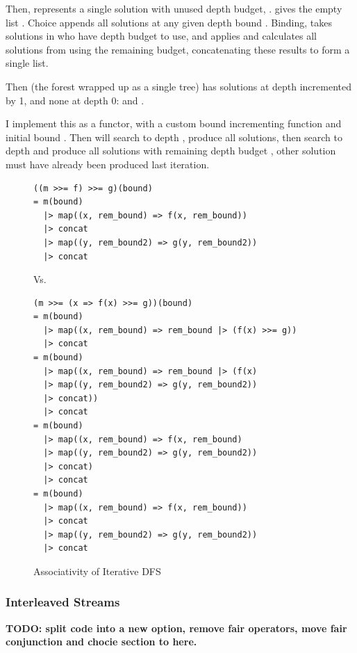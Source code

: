 Then,  represents a single solution with unused depth budget, .  gives the empty list . Choice appends all solutions at any given depth bound . Binding,  takes solutions in  who have depth budget to use, and applies  and calculates all solutions from  using the remaining budget, concatenating these results to form a single list.

Then  (the forest  wrapped up as a single tree) has solutions at depth incremented by 1, and none at depth 0:  and .

I implement this as a functor, with a custom bound incrementing function  and initial bound . Then  will   search to depth , produce all solutions, then search to depth  and produce all solutions with remaining depth budget , other solution must have already been produced last iteration.

\begin{figure}
\begin{verbatim}
((m >>= f) >>= g)(bound)
= m(bound) 
  |> map((x, rem_bound) => f(x, rem_bound))
  |> concat
  |> map((y, rem_bound2) => g(y, rem_bound2))
  |> concat
\end{verbatim}
Vs.
\begin{verbatim}
(m >>= (x => f(x) >>= g))(bound)
= m(bound)
  |> map((x, rem_bound) => rem_bound |> (f(x) >>= g))
  |> concat
= m(bound)
  |> map((x, rem_bound) => rem_bound |> (f(x) 
  |> map((y, rem_bound2) => g(y, rem_bound2)) 
  |> concat))
  |> concat
= m(bound)
  |> map((x, rem_bound) => f(x, rem_bound) 
  |> map((y, rem_bound2) => g(y, rem_bound2))
  |> concat)
  |> concat
= m(bound)
  |> map((x, rem_bound) => f(x, rem_bound)) 
  |> concat
  |> map((y, rem_bound2) => g(y, rem_bound2))
  |> concat
\end{verbatim}
\caption{Associativity of Iterative DFS }
\end{figure}

\subsubsection{Interleaved Streams}
\textbf{TODO: split code into a new option, remove fair operators, move fair conjunction and chocie section to here.}


